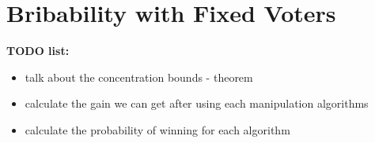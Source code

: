 
\section{Bribability with Fixed Voters}
\label{section:fixed_voters}

\noindent
\textbf{TODO list:}
\begin{itemize}
\item talk about the concentration bounds - theorem
\item calculate the gain we can get after using each manipulation algorithms
\item calculate the probability of winning for each algorithm
\end{itemize}